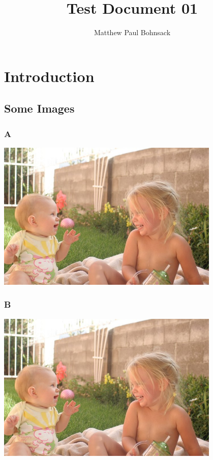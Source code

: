 \documentclass[mathserif,xcolor=dvipsnames,hyperref={bookmarks=true}]{beamer}
\title{Test Document 01}
\author[Matthew Bohnsack]{Matthew Paul Bohnsack}
\institute[UNM]{University of New Mexico\\Albuquerque, New Mexico USA}
\begin{document}
\begin{frame}
    \titlepage
\end{frame}

\section{Introduction}

\subsection{Some Images}
\begin{frame}[t]
    \frametitle{A}
    \begin{center}
        \includegraphics[width=0.8\textwidth]{../images/a.jpg}
    \end{center}
\end{frame}
\begin{frame}[t]
    \frametitle{B}
    \begin{center}
        \includegraphics[width=0.8\textwidth]{../images/b.jpg}
    \end{center}
\end{frame}
\end{document}
